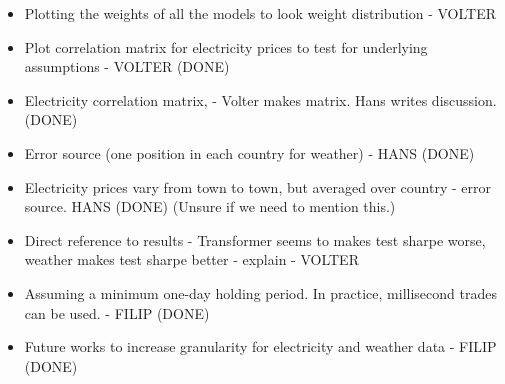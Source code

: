 \documentclass[12pt]{article}
\begin{document}
\begin{itemize}
\item Plotting the weights of all the models to look weight distribution - VOLTER
\item Plot correlation matrix for electricity prices to test for underlying assumptions - VOLTER (DONE)
\item Electricity correlation matrix, - Volter makes matrix. Hans writes discussion. (DONE)
\item Error source (one position in each country for weather) - HANS (DONE)
\item Electricity prices vary from town to town, but averaged over country - error source. HANS (DONE) (Unsure if we need to mention this.)
\item Direct reference to results - Transformer seems to makes test sharpe worse, weather makes test sharpe better - explain - VOLTER
\item Assuming a minimum one-day holding period. In practice, millisecond trades can be used. - FILIP (DONE)
\item Future works to increase granularity for electricity and weather data - FILIP (DONE)
\end{itemize}

\clearpage


\end{document}
